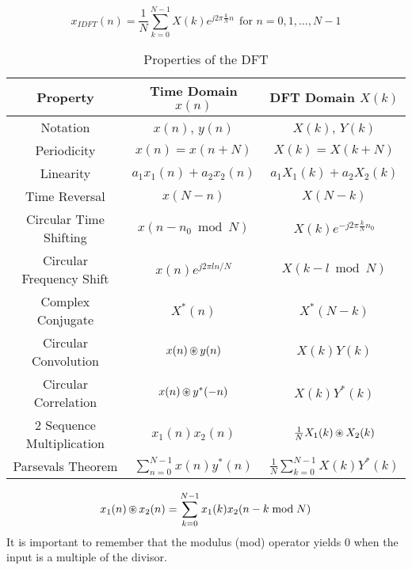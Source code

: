 \begin{equation}\label{eq:IDFT}
  x_{IDFT}(n) = \frac{1}{N} \sum\limits_{k=0}^{N-1} X(k) e^{j 2\pi \frac{k}{N} n} \:\: \text{for } n = 0, 1, \ldots, N-1
\end{equation}

\begin{table}[h!]
  \centering
  \begin{tabular}{ccc}
    \toprule
    Property & Time Domain $x(n)$ & DFT Domain $X(k)$ \\
    \midrule
    Notation & $x(n)$, $y(n)$ & $X(k)$, $Y(k)$ \\
    Periodicity & $x(n) = x(n+N)$ & $X(k) = X(k+N)$ \\
    Linearity & $a_{1}x_{1}(n) + a_{2}x_{2}(n)$ & $a_{1}X_{1}(k) + a_{2}X_{2}(k)$ \\
    Time Reversal & $x(N-n)$ & $X(N-k)$ \\
    Circular Time Shifting & $x(n - n_{0} \bmod N)$ & $X(k) e^{-j 2\pi \frac{k}{N} n_{0}} $ \\
    Circular Frequency Shift & $x(n)e^{j2\pi l n/N}$ & $X(k-l \bmod N)$ \\
    Complex Conjugate & $X^{*}(n)$ & $X^{*}(N-k)$ \\
    Circular Convolution & $x(n) \operatorname{\circledast} y(n)$ & $X(k)Y(k)$ \\
    Circular Correlation & $x(n) \operatorname{\circledast} y^{*}(-n)$ & $X(k)Y^{*}(k)$ \\
    2 Sequence Multiplication & $x_{1}(n)x_{2}(n)$ & $\frac{1}{N} X_{1}(k) \operatorname{\circledast} X_{2}(k)$ \\
    Parsevals Theorem & $\sum\limits_{n=0}^{N-1} x(n) y^{*}(n)$ & $\frac{1}{N} \sum\limits_{k=0}^{N-1} X(k)Y^{*}(k)$ \\
    \bottomrule
  \end{tabular}
  \caption{Properties of the DFT}
  \label{tab:DFT_Properties}
\end{table}

\begin{equation}\label{eq:Circular_Convolution-Simplified}
  x_{1}(n) \operatorname{\circledast} x_{2}(n) = \sum\limits_{k=0}^{N-1} x_{1}(k) x_{2}(n-k \bmod N)
\end{equation}
It is important to remember that the modulus (mod) operator yields 0 when the input is a multiple of the divisor.

